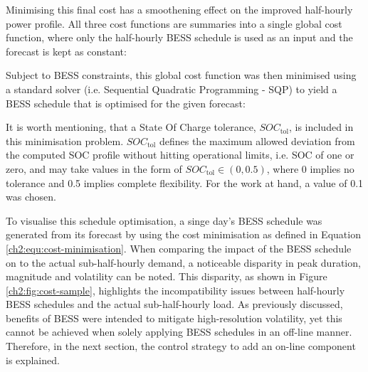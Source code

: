 

Minimising this final cost has a smoothening effect on the improved half-hourly power profile.
All three cost functions are summaries into a single global cost function, where only the half-hourly BESS schedule is used as an input and the forecast is kept as constant:



Subject to BESS constraints, this global cost function was then minimised using a standard solver (i.e. Sequential Quadratic Programming - SQP) to yield a BESS schedule that is optimised for the given forecast:



It is worth mentioning, that a State Of Charge tolerance, $SOC_\text{tol}$, is included in this minimisation problem.
$SOC_\text{tol}$ defines the maximum allowed deviation from the computed SOC profile without hitting operational limits, i.e. SOC of one or zero, and may take values in the form of $SOC_\text{tol} \in (0, 0.5)$, where 0 implies no tolerance and 0.5 implies complete flexibility.
For the work at hand, a value of 0.1 was chosen.



To visualise this schedule optimisation, a singe day's BESS schedule was generated from its forecast by using the cost minimisation as defined in Equation \ref{ch2:equ:cost-minimisation}.
When comparing the impact of the BESS schedule on to the actual sub-half-hourly demand, a noticeable disparity in peak duration, magnitude and volatility can be noted.
This disparity, as shown in Figure \ref{ch2:fig:cost-sample}, highlights the incompatibility issues between half-hourly BESS schedules and the actual sub-half-hourly load.
As previously discussed, benefits of BESS were intended to mitigate high-resolution volatility, yet this cannot be achieved when solely applying BESS schedules in an off-line manner.
Therefore, in the next section, the control strategy to add an on-line component is explained.




 